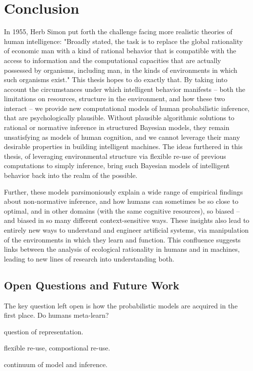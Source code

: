 \chapter{Conclusion}
\label{chap:conclusion}

In 1955, Herb Simon put forth the challenge facing more realistic theories of human intelligence: "Broadly stated, the task is to replace the global rationality of economic man with a kind of rational behavior that is compatible with the access to information and the computational capacities that are actually possessed by organisms, including man, in the kinds of environments in which such organisms exist." This thesis hopes to do exactly that. By taking into account the circumstances under which intelligent behavior manifests -- both the limitations on resources, structure in the environment, and how these two interact -- we provide new computational models of human probabilistic inference, that are psychologically plausible. Without plausible algorithmic solutions to rational or normative inference in structured Bayesian models, they remain unsatisfying as models of human cognition, and we cannot leverage their many desirable properties in building intelligent machines. The ideas furthered in this thesis, of leveraging environmental structure via flexible re-use of previous computations to simply inference, bring such Bayesian models of intelligent behavior back into the realm of the possible. 

Further, these models parsimoniously explain a wide range of empirical findings about non-normative inference, and how humans can sometimes be so close to optimal, and in other domains (with the same cognitive resources), so biased -- and biased in so many different context-sensitive ways. These insights also lead to entirely new ways to understand and engineer artificial systems, via manipulation of the environments in which they learn and function. This confluence suggests links between the analysis of ecological rationality in humans and in machines, leading to new lines of research into understanding both.

\section*{Open Questions and Future Work}

The key question left open is how the probabilistic models are acquired in the first place. Do humans meta-learn?

question of representation.

flexible re-use, compostional re-use.

continuum of model and inference.
